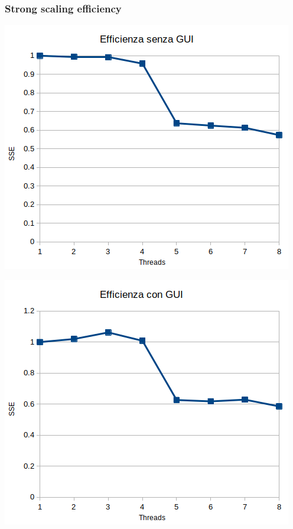 \documentclass[12pt,a4paper,oneside]{article}
\begin{document}
	\subsubsection{Strong scaling efficiency}
	\hfill
	\begin{minipage}{.45\textwidth}
		\centering
		\includegraphics[width=\linewidth]{sse-no-gui}
		\label{fig:sse-no-gui}
	\end{minipage}
	\hfill
	\begin{minipage}{.45\textwidth}
		\centering
		\includegraphics[width=\linewidth]{sse-gui}
		\label{fig:sse-gui}
	\end{minipage}
	\hfill
\end{document}
